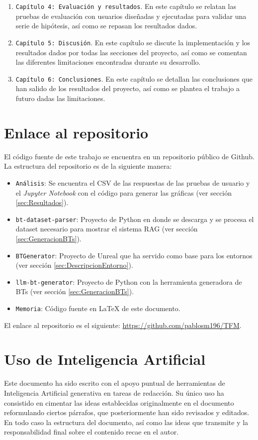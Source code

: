 \begin{enumerate}
\begin{enumerate}
	\end{enumerate}
	\item \texttt{Capítulo 4: Evaluación y resultados}. En este capítulo se relatan las pruebas de evaluación con usuarios diseñadas y ejecutadas para validar una serie de hipótesis, así como se repasan los resultados dados.
	\item \texttt{Capítulo 5: Discusión}. En este capítulo se discute la implementación y los resultados dados por todas las secciones del proyecto, así como se comentan las diferentes limitaciones encontradas durante su desarrollo.
	\item \texttt{Capítulo 6: Conclusiones}. En este capítulo se detallan las conclusiones que han salido de los resultados del proyecto, así como se plantea el trabajo a futuro dadas las limitaciones.
\end{enumerate}

\section{Enlace al repositorio}
El código fuente de este trabajo se encuentra en un repositorio público de Github.
La estructura del repositorio es de la siguiente manera:

\begin{itemize}
	\item \texttt{Análisis}: Se encuentra el CSV de las respuestas de las pruebas de usuario y el \textit{Jupyter Notebook} con el código para generar las gráficas (ver sección \ref{sec:Resultados}).
	\item \texttt{bt-dataset-parser}: Proyecto de Python en donde se descarga y se procesa el dataset necesario para mostrar el sistema RAG (ver sección \ref{sec:GeneracionBTs}).
	\item \texttt{BTGenerator}: Proyecto de Unreal que ha servido como base para los entornos (ver sección \ref{sec:DescripcionEntorno}).
	\item \texttt{llm-bt-generator}: Proyecto de Python con la herramienta generadora de BTs (ver sección \ref{sec:GeneracionBTs}).
	\item \texttt{Memoria}: Código fuente en LaTeX de este documento.
\end{itemize}

El enlace al repositorio es el siguiente: \url{https://github.com/pablosm196/TFM}.

\section{Uso de Inteligencia Artificial}
Este documento ha sido escrito con el apoyo puntual de herramientas de Inteligencia Artificial generativa en tareas de redacción.
Su único uso ha consistido en cimentar las ideas establecidas originalmente en el documento reformulando ciertos párrafos, que posteriormente han sido revisados y editados.
En todo caso la estructura del documento, así como las ideas que transmite y la responsabilidad final sobre el contenido recae en el autor.